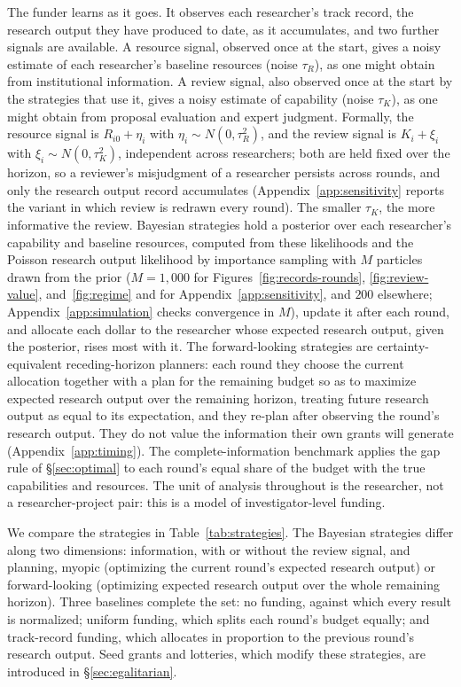 \documentclass[article, 11pt, reqno]{amsart}
\theoremstyle{named}
\begin{document}
The funder learns as it goes. It observes each researcher's track record, the research output they have produced to date, as it accumulates, and two further signals are available. A resource signal, observed once at the start, gives a noisy estimate of each researcher's baseline resources (noise $\tau_R$), as one might obtain from institutional information. A review signal, also observed once at the start by the strategies that use it, gives a noisy estimate of capability (noise $\tau_K$), as one might obtain from proposal evaluation and expert judgment. Formally, the resource signal is $R_{i0} + \eta_i$ with $\eta_i \sim N(0, \tau_R^2)$, and the review signal is $K_i + \xi_i$ with $\xi_i \sim N(0, \tau_K^2)$, independent across researchers; both are held fixed over the horizon, so a reviewer's misjudgment of a researcher persists across rounds, and only the research output record accumulates (Appendix~\ref{app:sensitivity} reports the variant in which review is redrawn every round). The smaller $\tau_K$, the more informative the review. Bayesian strategies hold a posterior over each researcher's capability and baseline resources, computed from these likelihoods and the Poisson research output likelihood by importance sampling with $M$ particles drawn from the prior ($M = 1{,}000$ for Figures~\ref{fig:records-rounds}, \ref{fig:review-value}, and~\ref{fig:regime} and for Appendix~\ref{app:sensitivity}, and $200$ elsewhere; Appendix~\ref{app:simulation} checks convergence in $M$), update it after each round, and allocate each dollar to the researcher whose expected research output, given the posterior, rises most with it. The forward-looking strategies are certainty-equivalent receding-horizon planners: each round they choose the current allocation together with a plan for the remaining budget so as to maximize expected research output over the remaining horizon, treating future research output as equal to its expectation, and they re-plan after observing the round's research output. They do not value the information their own grants will generate (Appendix~\ref{app:timing}). The complete-information benchmark applies the gap rule of \S\ref{sec:optimal} to each round's equal share of the budget with the true capabilities and resources. The unit of analysis throughout is the researcher, not a researcher-project pair: this is a model of investigator-level funding.

We compare the strategies in Table~\ref{tab:strategies}. The Bayesian strategies differ along two dimensions: information, with or without the review signal, and planning, myopic (optimizing the current round's expected research output) or forward-looking (optimizing expected research output over the whole remaining horizon). Three baselines complete the set: no funding, against which every result is normalized; uniform funding, which splits each round's budget equally; and track-record funding, which allocates in proportion to the previous round's research output. Seed grants and lotteries, which modify these strategies, are introduced in \S\ref{sec:egalitarian}.
\end{document}
